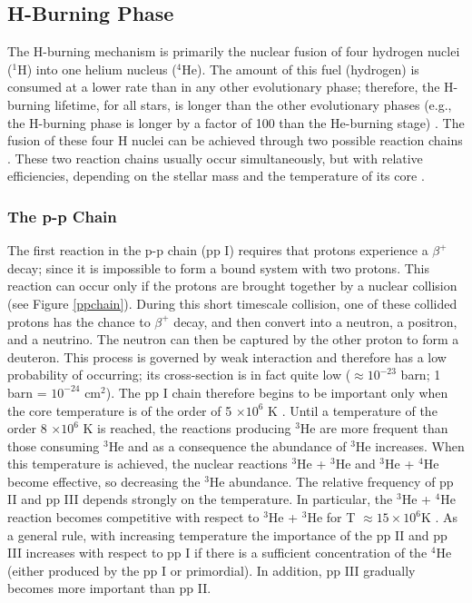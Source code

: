 \subsection{H-Burning Phase}
The H-burning mechanism is primarily the nuclear fusion of four hydrogen nuclei ($^{1}$H) into one helium nucleus ($^{4}$He). The amount of this fuel (hydrogen) is consumed at a lower rate than in any other evolutionary phase; therefore, the H-burning lifetime, for all stars, is longer than the other evolutionary phases (e.g., the H-burning phase is longer by a factor of 100 than the He-burning stage) \citep[e.g.,][]{2010JKPS...56.1673C}. The fusion of these four H nuclei can be achieved through two possible reaction chains \citep[namely the p-p chain and the CNO cycle,][]{2018Natur.562..505B, 2018PhP....20..124W}. These two reaction chains usually occur simultaneously, but with relative efficiencies, depending on the stellar mass and the temperature of its core \citep[e.g.,][]{1990ApJS...74..463C}.


\subsubsection{The p-p Chain}
The first reaction in the p-p chain (pp I) requires that protons experience a $\beta^{+}$ decay; since it is impossible to form a bound system with two protons. This reaction can occur only if the protons are brought together by a nuclear collision (see Figure \ref{ppchain}). During this short timescale collision, one of these collided protons has the chance to $\beta^{+}$ decay, and then convert into a neutron, a positron, and a neutrino. The neutron can then be captured by the other proton to form a deuteron. This process is governed by weak interaction and therefore has a low probability of occurring; its cross-section is in fact quite low ($\approx 10^{-23}$ barn; 1 barn = $10^{-24}$ cm$^{2}$). The pp I chain therefore begins to be important only when the core temperature is of the order of 5 $\times 10^{6}$ K \citep{2018Natur.562..505B}. Until a temperature of the order 8 $\times 10^{6}$ K is reached, the reactions producing $^{3}$He are more frequent than those consuming $^{3}$He and as a consequence the abundance of $^{3}$He increases. When this temperature is achieved, the nuclear reactions $^{3}$He + $^{3}$He and $^{3}$He + $^{4}$He become effective, so decreasing the $^{3}$He abundance. The relative frequency of pp II and pp III depends strongly on the temperature. In particular, the $^{3}$He + $^{4}$He reaction becomes competitive with respect to $^{3}$He + $^{3}$He for T $\approx 15 \times 10^{6}$K \citep{leblanc2010introduction}. As a general rule, with increasing temperature the importance of the pp II and pp III increases with respect to pp I if there is a sufficient concentration of the $^{4}$He (either produced by the pp I or primordial). In addition, pp III gradually becomes more important than pp II.







